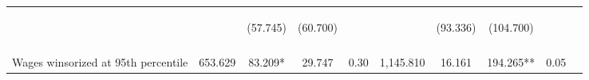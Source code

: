 \begin{tabular}{lccccccccc}
 & \begin{footnotesize}\end{footnotesize} & \begin{footnotesize}(57.745)\end{footnotesize} & \begin{footnotesize}(60.700)\end{footnotesize} & \begin{footnotesize}\end{footnotesize} & \begin{footnotesize}\end{footnotesize} & \begin{footnotesize}(93.336)\end{footnotesize} & \begin{footnotesize}(104.700)\end{footnotesize} & \begin{footnotesize}\end{footnotesize} & \begin{footnotesize}\end{footnotesize}\\
 & \begin{footnotesize}\end{footnotesize} & \begin{footnotesize}[0.295]\end{footnotesize} & \begin{footnotesize}[1.000]\end{footnotesize} & \begin{footnotesize}\end{footnotesize} & \begin{footnotesize}\end{footnotesize} & \begin{footnotesize}[1.000]\end{footnotesize} & \begin{footnotesize}[0.025]\end{footnotesize} & \begin{footnotesize}\end{footnotesize} & \begin{footnotesize}\end{footnotesize}\\
\noalign{\smallskip}Wages winsorized at 95th percentile & 653.629 & 83.209* & 29.747 & 0.30 & 1,145.810 & 16.161 & 194.265** & 0.05 & \\

\end{tabular}
